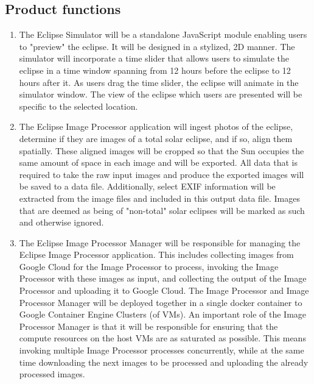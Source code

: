 \documentclass[10pt, onecolumn, draftclsnofoot, letterpaper, compsoc]{IEEEtran}
\begin{document}
\subsection{Product functions}
	\begin{enumerate}
		\item The Eclipse Simulator will be a standalone JavaScript
		module enabling users to "preview" the eclipse. It will be
		designed in a stylized, 2D manner. The simulator will
		incorporate a time slider that allows users to simulate the
		eclipse in a time window spanning from 12 hours before the
		eclipse to 12 hours after it. As users drag the time
		slider, the eclipse will animate in the simulator window.
		The view of the eclipse which users are presented will be
		specific to the selected location.

		\item The Eclipse Image Processor application will ingest
		photos of the eclipse, determine if they are images of a
		total solar eclipse, and if so, align them spatially.
		These aligned
		images will be cropped so that the Sun
		occupies the same amount of space in each image and will be
		exported. All data that is required to take the raw input
		images and produce the exported images will be saved to a
		data file. Additionally, select EXIF information will be
		extracted from the image files and included in this output
		data file. Images that are deemed as being of "non-total" solar
		eclipses will be marked as such and otherwise ignored.

		\item The Eclipse Image Processor Manager will be responsible for
		managing the Eclipse Image Processor application. This includes
		collecting images from Google Cloud for the Image Processor to process,
		invoking the Image Processor with these images as input, and collecting
		the output of the Image Processor and uploading it to Google Cloud. The
		Image Processor and Image Processor Manager will be deployed together
		in a single docker container to Google Container Engine Clusters (of VMs).
		An important role of the Image Processor Manager is that it will be responsible
		for ensuring that the compute resources on the host VMs are as saturated as
		possible. This means invoking multiple Image Processor processes concurrently,
		while at the same time downloading the next images to be processed and uploading
		the already processed images.


	\end{enumerate}
\end{document}
